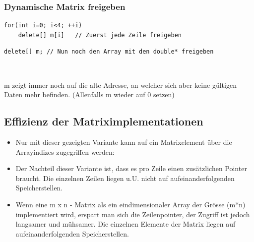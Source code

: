 \subsubsection{Dynamische Matrix freigeben}
\begin{minipage}{0.6\linewidth}
\begin{lstlisting}
for(int i=0; i<4; ++i)
	delete[] m[i]	// Zuerst jede Zeile freigeben
\end{lstlisting}
\end{minipage}
\begin{minipage}{\linewidth}
	
	\hspace{0.1\linewidth}
	
\end{minipage}
\vspace{\baselineskip}
\noindent
\begin{minipage}{\linewidth}
\begin{lstlisting}
delete[] m;	// Nun noch den Array mit den double* freigeben
\end{lstlisting}
\end{minipage}
\begin{figure}[hh]
	
	\hspace{0.1\linewidth}
	
\end{figure}
\vspace{\baselineskip}\\
\begin{achtung}
m zeigt immer noch auf die alte Adresse, an welcher sich aber keine gültigen Daten mehr befinden. (Allenfalls m wieder auf 0 setzen)
\end{achtung}

\subsection{Effizienz der Matriximplementationen}
\begin{itemize}
	\item Nur mit dieser gezeigten Variante kann auf ein Matrixelement über die Arrayindizes zugegriffen werden:
	\item Der Nachteil dieser Variante ist, dass es pro Zeile einen zusätzlichen Pointer braucht. Die einzelnen Zeilen liegen u.U. nicht auf aufeinanderfolgenden Speicherstellen.
	\item Wenn eine m x n - Matrix als ein eindimensionaler Array der Grösse (m*n) implementiert wird, erspart man sich die Zeilenpointer, der Zugriff ist jedoch langsamer und mühsamer. Die einzelnen Elemente der Matrix liegen auf aufeinanderfolgenden Speicherstellen.
\end{itemize}